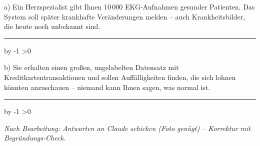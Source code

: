 \documentclass[10pt,a4paper]{article}
\newcommand{\antwortlinien}[1]{%
  \par\vspace{2pt}%
  \newcount\zeilen \zeilen=#1
  \loop
    \noindent\rule{\linewidth}{0.4pt}\par\vspace{11pt}%
    \advance\zeilen by -1
  \ifnum\zeilen>0 \repeat
}
\begin{document}
a) Ein Herzspezialist gibt Ihnen 10\,000 EKG-Aufnahmen gesunder Patienten. Das System soll
später krankhafte Veränderungen melden -- auch Krankheitsbilder, die heute noch unbekannt sind.
\antwortlinien{4}

b) Sie erhalten einen großen, ungelabelten Datensatz mit Kreditkartentransaktionen und sollen
\glqq Auffälligkeiten finden, die sich lohnen könnten anzuschauen\grqq{} -- niemand kann Ihnen
sagen, was normal ist.
\antwortlinien{4}

\vspace{10pt}
\begin{center}
\footnotesize\itshape
Nach Bearbeitung: Antworten an Claude schicken (Foto genügt) -- Korrektur mit Begründungs-Check.
\end{center}
\end{document}
